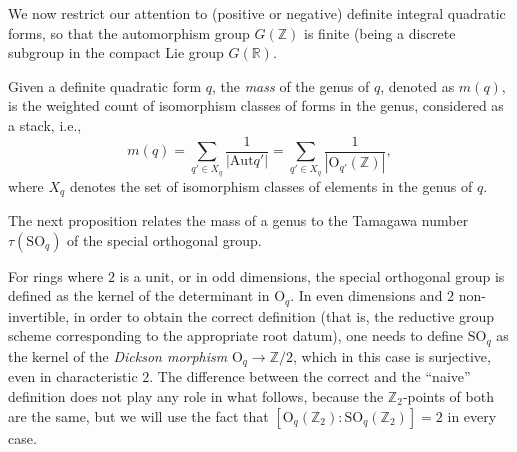 We now restrict our attention to (positive or negative) definite integral quadratic forms, so that the automorphism group $G(\mathbb Z)$ is finite (being a discrete subgroup in the compact Lie group $G(\mathbb R)$.

\begin{definition}
\label{definition-mass-quadratic-form}
    Given a definite quadratic form $q$, the {\it mass} of the genus of $q$, denoted as  $m(q)$, is the weighted count of isomorphism classes of forms in the genus, considered as a stack, i.e., 
    \[
	    m(q)=\sum_{q'\in X_q} \frac{1}{|\text{Aut} q'|}=\sum_{q'\in X_q} \frac{1}{|\text{O}_{q'}(\mathbb{Z})|},
    \]
    where $X_q$ denotes the set of isomorphism classes of elements in the genus of $q$.
\end{definition}


The next proposition relates the mass of a genus to the Tamagawa number $\tau(\text{SO}_q)$ of the special orthogonal group. 

\begin{remark}
 \label{remark-special-orthogonal-group}
For rings where $2$ is a unit, or in odd dimensions, the special orthogonal group is defined as the kernel of the determinant in $\text{O}_q$. In even dimensions and $2$ non-invertible, in order to obtain the correct definition (that is, the reductive group scheme corresponding to the appropriate root datum), one needs to define $\text{SO}_q$ as the kernel of the {\it Dickson morphism} $\text{O}_q\to \mathbb Z/2$, which in this case is surjective, even in characteristic $2$. The difference between the correct and the ``naive'' definition does not play any role in what follows, because the $\mathbb Z_2$-points of both are the same, but we will use the fact that $[\text{O}_q(\mathbb Z_2):\text{SO}_q(\mathbb Z_2)]=2$ in every case.
\end{remark}



